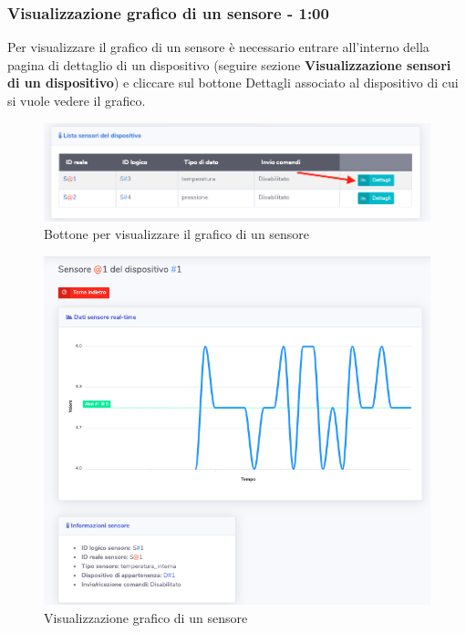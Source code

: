 	\subsubsection{Visualizzazione grafico di un sensore - 1:00}
		Per visualizzare il grafico di un sensore è necessario entrare all'interno della pagina di dettaglio di un dispositivo (seguire sezione \textbf{Visualizzazione sensori di un dispositivo}) e cliccare sul bottone Dettagli associato al dispositivo di cui si vuole vedere il grafico.
		\begin{figure}[H]
		\centering
		\includegraphics[scale=0.500]{res/images/membro/clicGraficoSens.png}
		\caption{Bottone per visualizzare il grafico di un sensore}
		\end{figure}
		\begin{figure}[H]
		\centering
		\includegraphics[scale=0.650]{res/images/membro/graficoSens.png}
		\caption{Visualizzazione grafico di un sensore}
		\end{figure}
		

